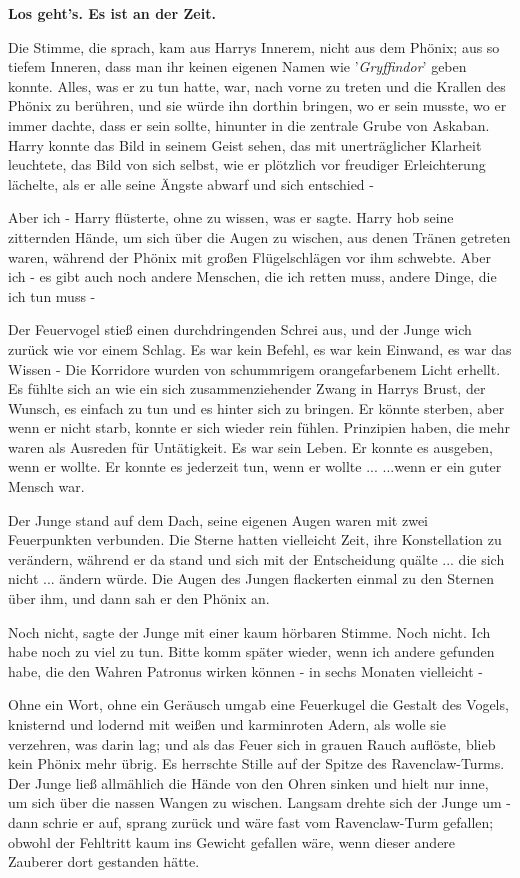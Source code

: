 \textbf{Los geht's. Es ist an der Zeit.
}

Die Stimme, die sprach, kam aus Harrys Innerem, nicht aus dem Phönix; aus so
tiefem Inneren, dass man ihr keinen eigenen Namen wie '\emph{Gryffindor}' geben
konnte. Alles, was er zu tun hatte, war, nach vorne zu treten und die Krallen
des Phönix zu berühren, und sie würde ihn dorthin bringen, wo er sein musste, wo
er immer dachte, dass er sein sollte, hinunter in die zentrale Grube von
Askaban. Harry konnte das Bild in seinem Geist sehen, das mit unerträglicher
Klarheit leuchtete, das Bild von sich selbst, wie er plötzlich vor freudiger
Erleichterung lächelte, als er alle seine Ängste abwarf und sich entschied -

\glqq{}Aber ich -\grqq{} Harry flüsterte, ohne zu wissen, was er sagte. Harry hob
seine zitternden Hände, um sich über die Augen zu wischen, aus denen Tränen
getreten waren, während der Phönix mit großen Flügelschlägen vor ihm schwebte.
\glqq{}Aber ich - es gibt auch noch andere Menschen, die ich retten muss, andere
Dinge, die ich tun muss -\grqq{}

Der Feuervogel stieß einen durchdringenden Schrei aus, und der Junge wich zurück
wie vor einem Schlag. Es war kein Befehl, es war kein Einwand, es war das Wissen
- Die Korridore wurden von schummrigem orangefarbenem Licht erhellt. Es fühlte
sich an wie ein sich zusammenziehender Zwang in Harrys Brust, der Wunsch, es
einfach zu tun und es hinter sich zu bringen. Er könnte sterben, aber wenn er
nicht starb, konnte er sich wieder rein fühlen. Prinzipien haben, die mehr waren
als Ausreden für Untätigkeit. Es war sein Leben. Er konnte es ausgeben, wenn er
wollte. Er konnte es jederzeit tun, wenn er wollte ... ...wenn er ein guter
Mensch war.

Der Junge stand auf dem Dach, seine eigenen Augen waren mit zwei Feuerpunkten
verbunden. Die Sterne hatten vielleicht Zeit, ihre Konstellation zu verändern,
während er da stand und sich mit der Entscheidung quälte ... die sich nicht ...
ändern würde. Die Augen des Jungen flackerten einmal zu den Sternen über ihm,
und dann sah er den Phönix an.

\glqq{}Noch nicht\grqq{}, sagte der Junge mit einer kaum hörbaren Stimme. \glqq{}
Noch nicht. Ich habe noch zu viel zu tun. Bitte komm später wieder, wenn ich
andere gefunden habe, die den Wahren Patronus wirken können - in sechs Monaten
vielleicht -\grqq{}

Ohne ein Wort, ohne ein Geräusch umgab eine Feuerkugel die Gestalt des Vogels,
knisternd und lodernd mit weißen und karminroten Adern, als wolle sie verzehren,
was darin lag; und als das Feuer sich in grauen Rauch auflöste, blieb kein
Phönix mehr übrig. Es herrschte Stille auf der Spitze des Ravenclaw-Turms. Der
Junge ließ allmählich die Hände von den Ohren sinken und hielt nur inne, um sich
über die nassen Wangen zu wischen. Langsam drehte sich der Junge um - dann
schrie er auf, sprang zurück und wäre fast vom Ravenclaw-Turm gefallen; obwohl
der Fehltritt kaum ins Gewicht gefallen wäre, wenn dieser andere Zauberer dort
gestanden hätte.

